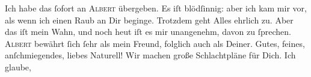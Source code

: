 \pstart
           Ich habe das \label{K_L02621-2v}\label{K_L02621-2} ſofort an \textsc{Albert} übergeben. Es iſt blödſinnig: aber ich kam mir vor, als wenn ich einen Raub an
               Dir beginge. Trotzdem geht Alles ehrlich zu. Aber das iſt mein Wahn, und noch heut{ }{\pb}iſt es mir unangenehm, davon zu ſprechen. \textsc{Albert} bewährt ſich ſehr als mein Freund, folglich auch als Deiner. Gutes, feines,
               anſchmiegendes, liebes Naturell! Wir machen große Schlachtpläne für Dich. Ich glaube,
